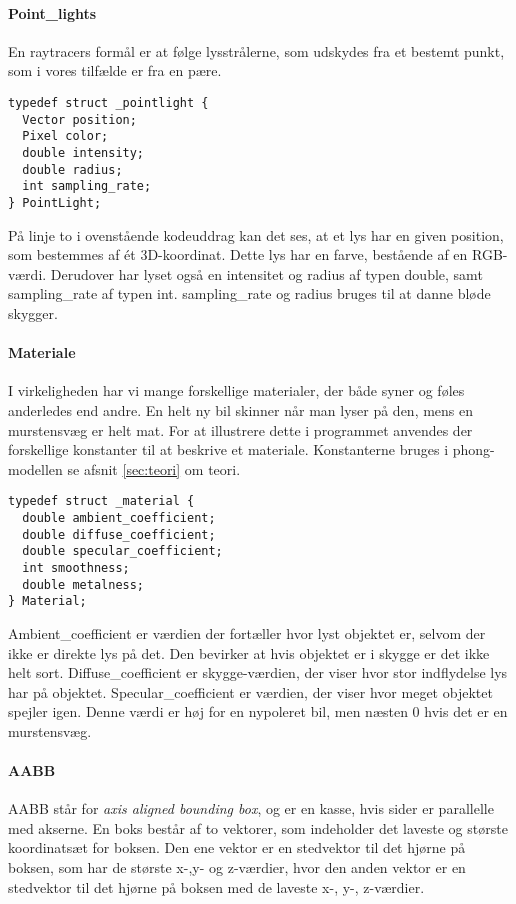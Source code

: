 \paragraph{Point\_lights}

En raytracers formål er at følge lysstrålerne, som udskydes fra et bestemt punkt, som i vores tilfælde er fra en pære. 

\begin{lstlisting}[style=Cstyle, caption=Struct til light]
typedef struct _pointlight {
  Vector position;
  Pixel color;
  double intensity;
  double radius;
  int sampling_rate;
} PointLight;
\end{lstlisting}

På linje to i ovenstående kodeuddrag kan det ses, at et lys har en given position, som bestemmes af ét 3D-koordinat. Dette lys har en farve, bestående af en RGB-værdi. Derudover har lyset også en intensitet og radius af typen double, samt sampling\_rate af typen int. sampling\_rate og radius bruges til at danne bløde skygger.

\paragraph{Materiale}
I virkeligheden har vi mange forskellige materialer, der både syner og føles anderledes end andre. En helt ny bil skinner når man lyser på den, mens en murstensvæg er helt mat. For at illustrere dette i programmet anvendes der forskellige konstanter til at beskrive et materiale. Konstanterne bruges i phong-modellen se afsnit \ref{sec:teori} om teori.

\begin{lstlisting}[style=Cstyle, caption=Struct til Material]
typedef struct _material {
  double ambient_coefficient;
  double diffuse_coefficient;
  double specular_coefficient;
  int smoothness;
  double metalness; 
} Material;
\end{lstlisting}

Ambient\_coefficient er værdien der fortæller hvor lyst objektet er, selvom der ikke er direkte lys på det. Den bevirker at hvis objektet er i skygge er det ikke helt sort.
Diffuse\_coefficient er skygge-værdien, der viser hvor stor indflydelse lys har på objektet. 
Specular\_coefficient er værdien, der viser hvor meget objektet spejler igen. Denne værdi er høj for en nypoleret bil, men næsten 0 hvis det er en murstensvæg.

\paragraph{AABB}
AABB står for \textit{axis aligned bounding box}, og er en kasse, hvis sider er parallelle med akserne. En boks består af to vektorer, som indeholder det laveste og største koordinatsæt for boksen. Den ene vektor er en stedvektor til det hjørne på boksen, som har de største x-,y- og z-værdier, hvor den anden vektor er en stedvektor til det hjørne på boksen med de laveste x-, y-, z-værdier. 

